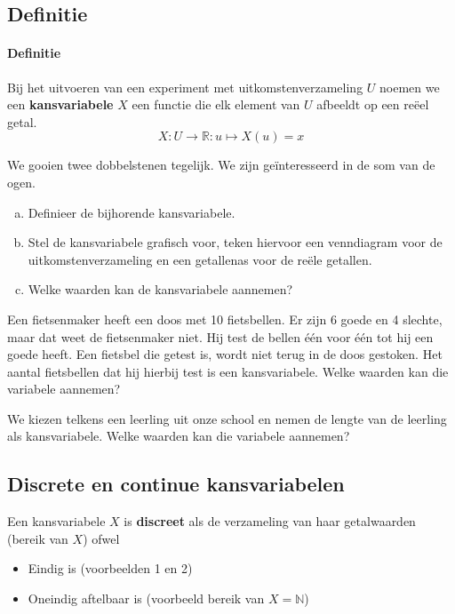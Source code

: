 \documentclass[12pt,twoside]{article}
\begin{document}
\subsection{Definitie}

\begin{mdframed}
\paragraph*{Definitie}
Bij het uitvoeren van een experiment met uitkomstenverzameling $U$ noemen we een {\bf kansvariabele} $X$ een functie die elk element van $U$ afbeeldt op een reëel getal.
$$X:U\to\mathbb{R}:u\mapsto X(u)=x$$
\end{mdframed}

\begin{oefening}
We gooien twee dobbelstenen tegelijk. We zijn geïnteresseerd in de som van de ogen.
\begin{enumerate}[(a)]
  \item Definieer de bijhorende kansvariabele.
  \item Stel de kansvariabele grafisch voor, teken hiervoor een venndiagram voor de uitkomstenverzameling en een getallenas voor de reële getallen.
  \item Welke waarden kan de kansvariabele aannemen?
\end{enumerate}
\end{oefening}

\begin{oefening}
Een fietsenmaker heeft een doos met 10 fietsbellen. Er zijn 6 goede en 4 slechte, maar dat weet de fietsenmaker niet. Hij test de bellen één voor één tot hij een goede heeft. Een fietsbel die getest is, wordt niet terug in de doos gestoken. Het aantal fietsbellen dat hij hierbij test is een kansvariabele.
Welke waarden kan die variabele aannemen?
\end{oefening}

\begin{oefening}
We kiezen telkens een leerling uit onze school en nemen de lengte van de leerling als kansvariabele. Welke waarden kan die variabele aannemen?
\end{oefening}

\subsection{Discrete en continue kansvariabelen}

Een kansvariabele $X$ is {\bf discreet} als de verzameling van haar getalwaarden (bereik van $X$) ofwel
\begin{itemize}
  \item Eindig is (voorbeelden 1 en 2)
  \item Oneindig aftelbaar is (voorbeeld bereik van $X=\mathbb{N}$)
\end{itemize}
\end{document}
